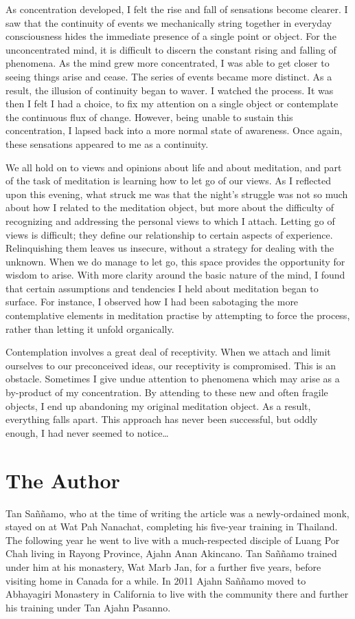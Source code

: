 As concentration developed, I felt the rise and fall of sensations
become clearer. I saw that the continuity of events we mechanically
string together in everyday consciousness hides the immediate presence
of a single point or object. For the unconcentrated mind, it is
difficult to discern the constant rising and falling of phenomena. As
the mind grew more concentrated, I was able to get closer to seeing
things arise and cease. The series of events became more distinct. As a
result, the illusion of continuity began to waver. I watched the
process. It was then I felt I had a choice, to fix my attention on a
single object or contemplate the continuous flux of change. However, 
being unable to sustain this concentration, I lapsed back into a more
normal state of awareness. Once again, these sensations appeared to me
as a continuity. 

We all hold on to views and opinions about life and about meditation, 
and part of the task of meditation is learning how to let go of our
views. As I reflected upon this evening, what struck me was that the
night's struggle was not so much about how I related to the meditation
object, but more about the difficulty of recognizing and addressing the
personal views to which I attach. Letting go of views is difficult; they
define our relationship to certain aspects of experience. Relinquishing
them leaves us insecure, without a strategy for dealing with the
unknown. When we do manage to let go, this space provides the
opportunity for wisdom to arise. With more clarity around the basic
nature of the mind, I found that certain assumptions and tendencies I
held about meditation began to surface. For instance, I observed how I
had been sabotaging the more contemplative elements in meditation
practise by attempting to force the process, rather than letting it
unfold organically. 

Contemplation involves a great deal of receptivity. When we attach and
limit ourselves to our preconceived ideas, our receptivity is
compromised. This is an obstacle. Sometimes I give undue attention to
phenomena which may arise as a by-product of my concentration. By
attending to these
new and often fragile objects, I end up abandoning my original
meditation object. As a result, everything falls apart. This approach
has never been successful, but oddly enough, I had never seemed to
notice\ldots{}

\dividerRule

\section{The Author}

Tan Saññamo, who at the time of writing the article was a
newly-ordained monk, stayed on at Wat Pah Nanachat, completing his
five-year training in Thailand. The following year he went to live with
a much-respected disciple of Luang Por Chah living in Rayong Province, 
Ajahn Anan Akincano. Tan Saññamo trained under him at his monastery, Wat
Marb Jan, for a further five years, before visiting home in Canada for a
while. In 2011 Ajahn Saññamo moved to Abhayagiri Monastery in California
to live with the community there and further his training under Tan
Ajahn Pasanno.

